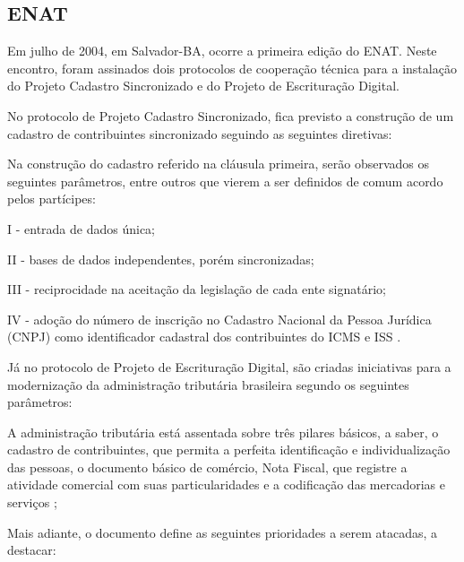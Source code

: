 \subsection{ENAT}

Em julho de 2004, em Salvador-BA, ocorre a primeira edição do ENAT. Neste encontro, foram assinados dois protocolos de cooperação  técnica para a instalação do Projeto Cadastro Sincronizado e do Projeto de Escrituração Digital.

No protocolo de Projeto Cadastro Sincronizado, fica previsto a construção de um cadastro de contribuintes sincronizado seguindo as seguintes diretivas:

\begin{citacao}
Na construção do cadastro referido na cláusula primeira, serão observados os seguintes parâmetros, entre outros que vierem a ser definidos de comum acordo pelos partícipes:

I - entrada de dados única;

II - bases de dados independentes, porém sincronizadas;

III - reciprocidade na aceitação da legislação de cada ente signatário;

IV - adoção do número de inscrição no Cadastro Nacional da Pessoa Jurídica (CNPJ)  como identificador cadastral dos contribuintes do ICMS  e ISS  \cite{enat:2004:protocolo1}.
\end{citacao}

Já no protocolo de Projeto de Escrituração Digital, são criadas iniciativas para a modernização da administração tributária brasileira segundo os seguintes parâmetros:

\begin{citacao}
A administração tributária está assentada sobre três pilares básicos, a saber, o cadastro de contribuintes, que permita a perfeita identificação e individualização das pessoas, o documento básico de comércio, Nota Fiscal, que registre a atividade comercial com suas particularidades e a codificação das mercadorias e serviços \cite{enat:2004:protocolo1};
\end{citacao}

Mais adiante, o documento define as seguintes prioridades a serem atacadas, a destacar:

